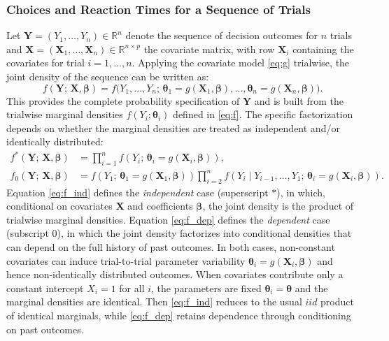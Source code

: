 \documentclass[00-main.tex]{subfiles}
\begin{document}
\subsubsection{Choices and Reaction Times for a Sequence of Trials}
Let $\bm{Y} = (Y_1, \dots, Y_n) \in \mathbb{R}^n$ denote the sequence of decision outcomes for $n$ trials and $\bm{X} = (\bm{X}_1, \dots, \bm{X}_n) \in \mathbb{R}^{n\times p}$ the covariate matrix, with row $\bm{X}_i$ containing the covariates for trial $i = 1, \dots, n$. Applying the covariate model \eqref{eq:g} trialwise, the joint density of the sequence can be written as:
\begin{equation}\label{eq:f_joint}
    f(\bm{Y};\, \bm{X}, \bm{\beta}) = f\bigl(Y_1, \dots, Y_n;\,
    \bm{\theta}_1 = g(\bm{X}_1, \bm\beta), \dots, \bm{\theta}_n = g(\bm{X}_n, \bm\beta)\bigr).
\end{equation}
This provides the complete probability specification of $\bm{Y}$ and is built
from the trialwise marginal densities $f(Y_i; \bm{\theta}_i)$ defined in
\eqref{eq:f}. The specific factorization depends on whether the marginal
densities are treated as independent and/or identically distributed:
\begin{subequations}
\begin{align}
    f^*(\bm{Y};\, \bm{X}, \bm{\beta}) &=
        \prod_{i=1}^n f\!\left(Y_i;\, \bm{\theta}_i = g(\bm{X}_i,
        \bm{\beta})\right), \label{eq:f_ind} \\
    f_0(\bm{Y};\, \bm{X}, \bm{\beta}) &=
        f\!\left(Y_1;\, \bm{\theta}_1 = g(\bm{X}_1, \bm{\beta})\right)
        \prod_{i=2}^n f\!\left(Y_i \mid Y_{i-1}, \dots, Y_1;\,
        \bm{\theta}_i = g(\bm{X}_i, \bm{\beta})\right). \label{eq:f_dep}
\end{align}
\end{subequations}
Equation \eqref{eq:f_ind} defines the \emph{independent} case (superscript $*$), in which, conditional on covariates $\bm{X}$ and coefficients $\bm{\beta}$, the joint density is the product of trialwise marginal densities. Equation \eqref{eq:f_dep} defines the \emph{dependent} case (subscript $0$), in which the joint density factorizes into conditional densities that can depend on the full history of past outcomes. In both cases, non-constant covariates can induce trial-to-trial parameter variability $\bm{\theta}_i = g(\bm{X}_i, \bm{\beta})$ and hence non-identically distributed outcomes. When covariates contribute only a constant intercept $X_i = 1$ for all $i$, the parameters are fixed $\bm{\theta}_i = \bm{\theta}$ and the marginal densities are identical. Then \eqref{eq:f_ind} reduces to the usual $iid$ product of identical marginals, while \eqref{eq:f_dep} retains dependence through conditioning on past outcomes.
\end{document}
